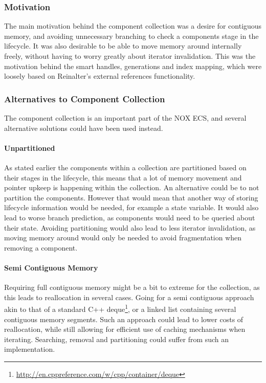 \subsubsection{Motivation}
The main motivation behind the component collection was a desire for contiguous memory, and avoiding unnecessary
branching to check a components stage in the lifecycle.
It was also desirable to be able to move memory around internally freely, without having to worry greatly about
iterator invalidation. This was the motivation behind the smart handles, generations and index mapping, which were loosely based
on Reinalter\cite{molecular_matters_dod_external_references}'s external references functionality.

\subsubsection{Alternatives to Component Collection}
The component collection is an important part of the NOX ECS, and several alternative solutions could have been used instead.

\paragraph{Unpartitioned}
As stated earlier the components within a collection are partitioned based on their stages in the lifecycle,
this means that a lot of memory movement and pointer upkeep is happening within the collection.
An alternative could be to not partition the components. However that would mean that another way of storing
lifecycle information would be needed, for example a state variable.
It would also lead to worse branch prediction, as components would need to be queried about their state.
Avoiding partitioning would also lead to less iterator invalidation, as moving memory around would
only be needed to avoid fragmentation when removing a component.

\paragraph{Semi Contiguous Memory}
Requiring full contiguous memory might be a bit to extreme for the collection, as this leads to
reallocation in several cases. Going for a semi contiguous approach akin to that of a standard C++ deque\footnote{\url{http://en.cppreference.com/w/cpp/container/deque}},
or a linked list containing several contiguous memory segments.
Such an approach could lead to lower costs of reallocation, while still allowing for efficient use of caching mechanisms
when iterating.
Searching, removal and partitioning could suffer from such an implementation.


